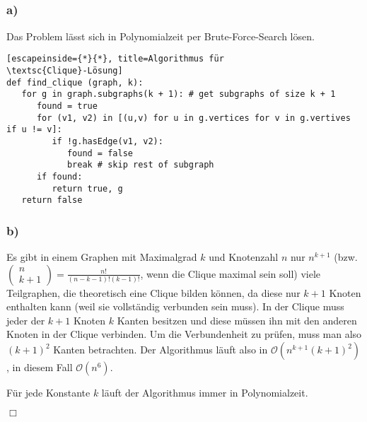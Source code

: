 \documentclass{article}
\begin{document}
\subsection{} 

\subsubsection{a)}


Das Problem lässt sich in Polynomialzeit per Brute-Force-Search lösen.
\begin{lstlisting}[escapeinside={*}{*}, title=Algorithmus für
\textsc{Clique}-Lösung]
def find_clique (graph, k):
   for g in graph.subgraphs(k + 1): # get subgraphs of size k + 1
      found = true
      for (v1, v2) in [(u,v) for u in g.vertices for v in g.vertives if u != v]:
         if !g.hasEdge(v1, v2):
            found = false
            break # skip rest of subgraph
      if found:
         return true, g
   return false
\end{lstlisting}

\subsubsection{b)}

Es gibt in einem Graphen mit Maximalgrad $k$ und Knotenzahl $n$ nur
$n^{k+1}$ (bzw. $\left(\begin{array}{c}n \\ k +
1\end{array}\right) = \frac{n!}{(n-k-1)!(k-1)!}$, wenn die Clique maximal sein
soll)  viele Teilgraphen, die theoretisch eine Clique bilden können,
da diese nur $k + 1$ Knoten enthalten kann (weil sie vollständig
verbunden sein muss). In der Clique muss jeder der $k + 1$ Knoten
$k$ Kanten besitzen und diese müssen ihn mit den anderen Knoten in
der Clique verbinden. Um die Verbundenheit zu prüfen, muss man also
$(k+1)^2$ Kanten betrachten. Der Algorithmus läuft also in
$\mathcal{O}\left(n^{k+1} (k+1)^2\right)$, in diesem Fall
$\mathcal{O}\left(n^6\right)$.

Für jede Konstante $k$ läuft der Algorithmus immer in Polynomialzeit.

\hfill{}$\Box$
\subsection{} 
\end{document}

